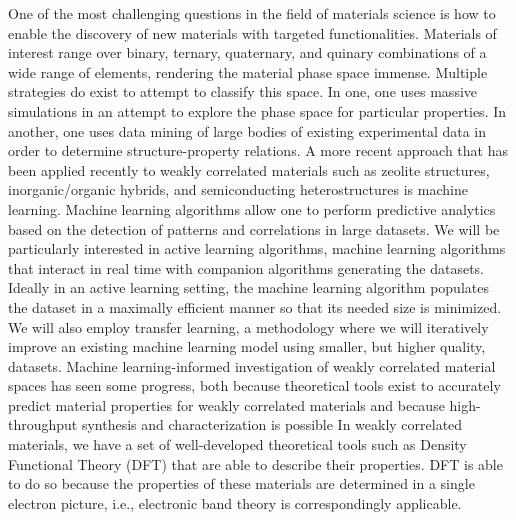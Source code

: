 \documentclass[11pt]{article}
\begin{document}
One of the most challenging questions in the field of materials
science is how to enable the discovery of new materials with targeted
functionalities. Materials of interest range over binary, ternary,
quaternary, and quinary combinations of a wide range of elements,
rendering the material phase space immense.  Multiple strategies do
exist to attempt to classify this space.  In one, one uses massive
simulations in an attempt to explore the phase space for particular
properties. In another, one uses data mining of large bodies of
existing experimental data in order to determine structure-property
relations.  A more recent approach that has been applied recently to
weakly correlated materials such as zeolite structures,
inorganic/organic hybrids, and semiconducting heterostructures is
machine learning.  Machine learning algorithms allow one to perform
predictive analytics based on the detection of patterns and
correlations in large datasets. We will be particularly interested in
active learning algorithms, machine learning algorithms that interact
in real time with companion algorithms generating the
datasets. Ideally in an active learning setting, the machine learning
algorithm populates the dataset in a maximally efficient manner so
that its needed size is minimized. We will also employ transfer
learning, a methodology where we will iteratively improve an existing
machine learning model using smaller, but higher quality, datasets.
Machine learning-informed investigation of weakly correlated material
spaces has seen some progress, both because theoretical tools exist to
accurately predict material properties for weakly correlated materials
and because high-throughput synthesis and characterization is possible
In weakly correlated materials, we have
a set of well-developed theoretical tools such as Density Functional
Theory (DFT) that are able to describe their properties. DFT is able
to do so because the properties of these materials are determined in a
single electron picture, i.e., electronic band theory is
correspondingly applicable.
\end{document}
